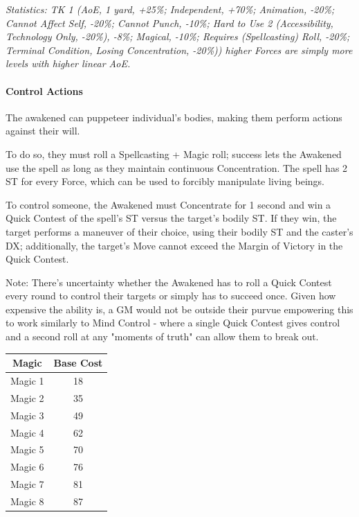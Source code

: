 \begin{multicols*}{3}
	\textcolor{OliveGreen}{\textit{Statistics: TK 1 (AoE, 1 yard, +25\%; Independent, +70\%; Animation, -20\%; Cannot Affect Self, -20\%; Cannot Punch, -10\%; Hard to Use 2 (Accessibility, Technology Only, -20\%), -8\%; Magical, -10\%; Requires (Spellcasting) Roll, -20\%; Terminal Condition, Losing Concentration, -20\%)) higher Forces are simply more levels with higher linear AoE.}}
	
	\paragraph{Control Actions}
	
	The awakened can puppeteer individual's bodies, making them perform actions against their will.
	
	To do so, they must roll a Spellcasting + Magic roll; success lets the Awakened use the spell as long as they maintain continuous Concentration. The spell has 2 ST for every Force, which can be used to forcibly manipulate living beings.
	
	To control someone, the Awakened must Concentrate for 1 second and win a Quick Contest of the spell's ST versus the target's bodily ST. If they win, the target performs a maneuver of their choice, using their bodily ST and the caster's DX; additionally, the target's Move cannot exceed the Margin of Victory in the Quick Contest.
	
	Note: There's uncertainty whether the Awakened has to roll a Quick Contest every round to control their targets or simply has to succeed once. Given how expensive the ability is, a GM would not be outside their purvue empowering this to work similarly to Mind Control - where a single Quick Contest gives control and a second roll at any "moments of truth" can allow them to break out.
	
	\begin{center}
		\begin{tabular}{|c|c|}
			\hline
			Magic & Base Cost \\
			\hline
			\hline
			Magic 1 & 18 \\
			Magic 2 & 35 \\
			Magic 3 & 49 \\
			Magic 4 & 62 \\
			Magic 5 & 70 \\
			Magic 6 & 76 \\
			Magic 7 & 81 \\
			Magic 8 & 87 \\
			\hline
		\end{tabular}
	\end{center}
	

\end{multicols*}
